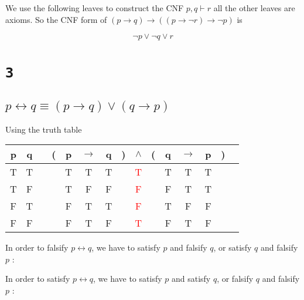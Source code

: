 \documentclass[a4paper,11pt]{report}
\begin{document}
We use the following leaves to construct the CNF $p,q \vdash r$ all the other
leaves are axioms. So the CNF form of $(p \to q) \to ((p \to \neg r) \to \neg
p)$ is

\[
  \neg p \vee \neg q \vee r
\]

\newpage

\section*{\texttt{3}}

\subsection*{\texttt{$ p \leftrightarrow q \equiv (p \to q) \vee (q \to p)$}}

Using the truth table

\begin{tabular}{@{ }c@{ }@{ }c | c@{ }@{}c@{}@{ }c@{ }@{ }c@{ }@{ }c@{ }@{}c@{}@{ }c@{ }@{}c@{}@{ }c@{ }@{ }c@{ }@{ }c@{ }@{}c@{}@{ }c}
p & q &  & ( & p & $\to$ & q & ) & $\wedge$ & ( & q & $\to$ & p & ) & \\
\hline 
T & T &  &  & T & T & T &  & \textcolor{red}{T} &  & T & T & T &  & \\
T & F &  &  & T & F & F &  & \textcolor{red}{F} &  & F & T & T &  & \\
F & T &  &  & F & T & T &  & \textcolor{red}{F} &  & T & F & F &  & \\
F & F &  &  & F & T & F &  & \textcolor{red}{T} &  & F & T & F &  & \\
\end{tabular}

In order to falsify $p \leftrightarrow q$, we have to satisfy $p$
and falsify $q$, or satisfy $q$ and falsify $p$ :

\begin{prooftree}
\end{prooftree}

In order to satisfy $p \leftrightarrow q$, we have to satisfy $p$
and satisfy $q$, or falsify $q$ and falsify $p$ :

\begin{prooftree}
\end{prooftree}
\end{document}
